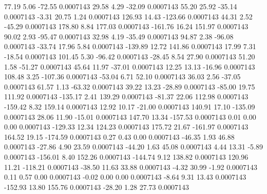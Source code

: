        77.19        5.06      -72.55     0.0007143
       29.58        4.29      -32.09     0.0007143
       55.20       25.92      -35.14     0.0007143
       -3.31       20.75        1.24     0.0007143
      126.93       14.43     -123.66     0.0007143
       44.31        2.52      -45.29     0.0007143
      178.80        8.84      177.03     0.0007143
     -161.76       16.24      151.97     0.0007143
       90.02        2.93      -95.47     0.0007143
       32.98        4.19      -35.49     0.0007143
       94.87        2.38      -96.08     0.0007143
      -33.74       17.96        5.84     0.0007143
     -139.89       12.72      141.86     0.0007143
       17.99        7.31      -18.54     0.0007143
      101.45        5.30      -96.42     0.0007143
      -28.45        8.54       27.90     0.0007143
       51.20        1.58      -51.27     0.0007143
       45.64       11.97      -37.01     0.0007143
       12.25       13.13      -16.96     0.0007143
      108.48        3.25     -107.36     0.0007143
      -53.04        6.71       52.10     0.0007143
       36.03        2.56      -37.05     0.0007143
       61.57        1.13      -63.32     0.0007143
       39.22       13.23      -28.89     0.0007143
      -85.00       19.75      111.92     0.0007143
     -135.17        2.41      139.29     0.0007143
      -81.37       22.06      112.98     0.0007143
     -159.42        8.32      159.14     0.0007143
       12.92       10.17      -21.00     0.0007143
      140.91       17.10     -135.09     0.0007143
       28.06       11.90      -15.01     0.0007143
      147.70       13.34     -157.53     0.0007143
        0.01        0.00        0.00     0.0007143
     -129.33       12.34      124.23     0.0007143
      175.72       21.67     -161.97     0.0007143
      164.52       19.15     -174.59     0.0007143
        0.27        0.43        0.00     0.0007143
      -46.35        1.93       46.88     0.0007143
      -27.86        4.90       23.59     0.0007143
      -44.20        1.63       45.08     0.0007143
        4.44       13.31       -5.89     0.0007143
     -156.01        8.40      152.26     0.0007143
     -144.74        9.12      138.82     0.0007143
      120.96       11.21     -118.21     0.0007143
      -38.50       11.63       33.88     0.0007143
       -4.32       30.99       -1.92     0.0007143
        0.11        0.57        0.00     0.0007143
       -0.02        0.00        0.00     0.0007143
       -8.64        9.31       13.43     0.0007143
     -152.93       13.80      155.76     0.0007143
      -28.20        1.28       27.73     0.0007143
